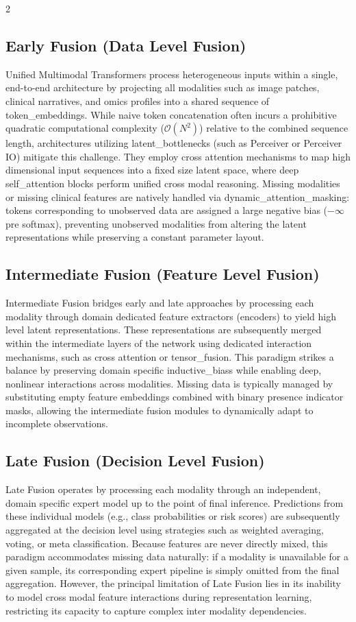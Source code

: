 \documentclass[10pt]{article}
\begin{document}
\begin{multicols}{2}
\subsection{Early Fusion (Data Level Fusion)}
Unified Multimodal Transformers process heterogeneous inputs within a single, 
end-to-end architecture by projecting all modalities such as image patches, clinical narratives, 
and omics profiles into a shared sequence of \glspl{token_embedding}. 
While naive token concatenation often incurs a prohibitive quadratic computational complexity 
($\mathcal{O}(N^2)$) relative to the combined sequence length, 
architectures utilizing \glspl{latent_bottleneck} (such as Perceiver or Perceiver IO) 
mitigate this challenge. They employ cross attention mechanisms to map high dimensional input sequences into a fixed size latent space, 
where deep \gls{self_attention} blocks perform unified cross modal reasoning. 
Missing modalities or missing clinical features are natively handled via \gls{dynamic_attention_masking}: tokens corresponding to unobserved data are assigned a large negative bias 
($-\infty$ pre softmax), preventing unobserved modalities from altering the latent representations while preserving a constant parameter layout.

\subsection{Intermediate Fusion (Feature Level Fusion)}
Intermediate Fusion bridges early and late approaches by processing each modality through domain dedicated feature extractors 
(encoders) to yield high level latent representations. 
These representations are subsequently merged within the intermediate layers of the network using dedicated interaction mechanisms, 
such as cross attention or \gls{tensor_fusion}. 
This paradigm strikes a balance by preserving domain specific \glspl{inductive_bias} while enabling deep, 
nonlinear interactions across modalities. 
Missing data is typically managed by substituting empty feature embeddings combined with binary presence indicator masks, 
allowing the intermediate fusion modules to dynamically adapt to incomplete observations.

\subsection{Late Fusion (Decision Level Fusion)}
Late Fusion operates by processing each modality through an independent, 
domain specific expert model up to the point of final inference. 
Predictions from these individual models 
(e.g., class probabilities or risk scores) 
are subsequently aggregated at the decision level using strategies such as weighted averaging, 
voting, or meta classification. 
Because features are never directly mixed, 
this paradigm accommodates missing data naturally: if a modality is unavailable for a given sample, its corresponding expert pipeline is simply omitted from the final aggregation. 
However, the principal limitation of Late Fusion lies in its inability to model cross modal feature interactions during representation learning, 
restricting its capacity to capture complex inter modality dependencies.


\end{multicols}
\end{document}
